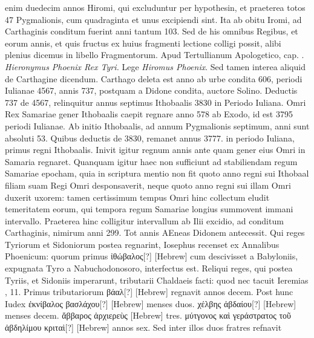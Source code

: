 enim duedecim annos Hiromi, qui excluduntur per hypothesin,
et praeterea totos 47 Pygmalionis, cum quadraginta et
unus excipiendi sint.
Ita ab obitu Iromi, ad Carthaginis conditum
fuerint anni tantum 103.
Sed de his omnibus Regibus, et
eorum annis, et quis fructus ex huius fragmenti lectione colligi
possit, alibi plenius dicemus in libello Fragmentorum.
Apud Tertullianum Apologetico, cap. .
\textit{Hieronymus Phoenix Rex Tyri.}
Lege \textit{Hiromus Phoenix}.
Sed tamen interea aliquid de Carthagine
dicendum.
Carthago deleta est anno ab urbe condita 606,
periodi Iulianae 4567, annis 737, postquam a Didone condita,
auctore Solino.
Deductis 737 de 4567, relinquitur annus
septimus Ithobaalis 3830 in Periodo Iuliana.
Omri Rex Samariae
gener Ithobaalis caepit regnare anno 578 ab Exodo, id
est 3795 periodi Iulianae.
Ab initio Ithobaalis, ad annum Pygmalionis
septimum, anni sunt absoluti 53.
Quibus deductis de
3830, remanet annus 3777. in periodo Iuliana, primus regni
Ithobaalis.
Inivit igitur regnum  annis ante quam gener eius
Omri in Samaria regnaret.
Quanquam igitur haec non sufficiunt
ad stabiliendam regum Samariae epocham, quia in scriptura mentio
non fit quoto anno regni sui Ithobaal filiam suam Regi Omri desponsaverit,
neque quoto anno regni sui illam Omri duxerit uxorem:
tamen certissimum tempus Omri hinc collectum eludit temeritatem
eorum, qui tempora regum Samariae longius summovent
immani intervallo.
%
Praeterea hinc colligitur intervallum
ab Ilii excidio, ad conditum Carthaginis, nimirum anni 299.
Tot annis AEneas Didonem antecessit.
Qui reges Tyriorum et Sidoniorum
postea regnarint, Iosephus recenset ex Annalibus Phoenicum:
quorum primus \textgreek{ἰθώβαλος[?]} \texthebrew{}[Hebrew]
 cum descivisset a Babyloniis,
expugnata Tyro a Nabuchodonosoro, interfectus est.
Reliqui reges, qui postea Tyriis, et Sidoniis imperarunt, tributarii
Chaldaeis facti: quod nec tacuit Ieremias , 11.
Primus tributariorum
\textgreek{βάαλ[?]} \texthebrew{}[Hebrew] regnavit annos decem.
Post hunc Iudex
\textgreek{ἐκνίβαλος βασλάχου[?]} \texthebrew{}[Hebrew] menses duos.
\textgreek{χέλβης ἀβδαίου[?]}
\texthebrew{}[Hebrew] menses decem.
\textgreek{ἄββαρος ἀρχιερεὺς} \texthebrew{}[Hebrew] tres.
\textgreek{μύτγονος
καὶ γεράστρατος τοῦ ἀβδηλίμου κριταὶ[?]} \texthebrew{}[Hebrew]
annos sex.
Sed inter illos duos fratres refnavit
